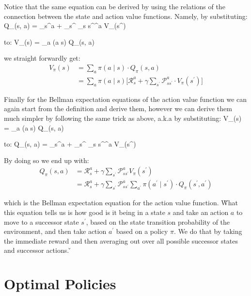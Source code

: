 Notice that the same equation can be derived by using the relations of the connection between the state and action
value functions. Namely, by substituting:
\bse
Q_{\pi}(s, a) = _{s}^{a} + \gamma \sum_{s^{\prime}} _{s s^\prime}^{a} V_{\pi}(s^\prime)
\ese

to:
\bse
V_{\pi}(s) = \sum_{a} \pi(a \mid s) \cdot Q_{\pi}(s, a)
\ese

we straight forwardly get:
\begin{align*}
V_{\pi}(s) &= \sum_{a} \pi(a \mid s) \cdot Q_{\pi}(s, a) \\
&=\sum_{a} \pi(a \mid s) \Big[\mathcal{R}_{s}^{a} +
\gamma \sum_{s^\prime} \mathcal{P}_{ss^\prime}^{a} \cdot V_{\pi}(s^\prime) \Big]
\end{align*}

Finally for the Bellman expectation equations of the action value function we can again start from the definition and
derive them, however we can derive them much simpler by following the same trick as above, a.k.a by substituting:
\bse
V_{\pi}(s) = \sum_{a} \pi(a \mid s) \cdot Q_{\pi}(s, a)
\ese

to:
\bse
Q_{\pi}(s, a) = _{s}^{a} + \gamma \sum_{s^{\prime}} _{s s^\prime}^{a} V_{\pi}(s^\prime)
\ese

By doing so we end up with:
\begin{align*}
Q_{\pi}(s, a) &= \mathcal{R}_{s}^{a} + \gamma \sum_{s^{\prime}} \mathcal{P}_{s s^\prime}^{a} V_{\pi}(s^\prime) \\
&= \mathcal{R}_{s}^{a} + \gamma \sum_{s^{\prime}} \mathcal{P}_{s s^\prime}^{a}
\sum_{a^\prime} \pi(a^\prime \mid s^\prime) \cdot Q_{\pi}(s^\prime, a^\prime)
\end{align*}

which is the Bellman expectation equation for the action value function. \v

What this equation tells us is how good is it being in a state $s$ and take an action $a$ to move to a successor
state $s^\prime$, based on the state transition probability of the environment, and then take action $a^\prime$ based
on a policy $\pi$. We do that by taking the immediate reward and then averaging out over all possible successor
states and successor actions. \v


\section{Optimal Policies}

